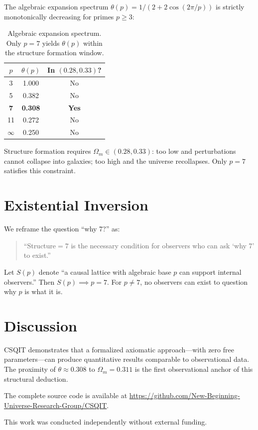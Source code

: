 \documentclass[aps,prl,twocolumn,nofootinbib,floatfix]{revtex4-2}
\begin{document}
The algebraic expansion spectrum $\theta(p) = 1/(2+2\cos(2\pi/p))$ is strictly monotonically decreasing for primes $p \ge 3$:

\begin{table}[h]
\centering
\begin{tabular}{ccc}
\hline
$p$ & $\theta(p)$ & In $(0.28,0.33)$? \\
\hline
3 & 1.000 & No \\
5 & 0.382 & No \\
\textbf{7} & \textbf{0.308} & \textbf{Yes} \\
11 & 0.272 & No \\
$\infty$ & 0.250 & No \\
\hline
\end{tabular}
\caption{Algebraic expansion spectrum. Only $p=7$ yields $\theta(p)$ within the structure formation window.}
\label{tab:spectrum}
\end{table}

Structure formation requires $\Omega_m \in (0.28,0.33)$: too low and perturbations cannot collapse into galaxies; too high and the universe recollapses. Only $p=7$ satisfies this constraint.

\section{Existential Inversion}

We reframe the question ``why 7?'' as:

\begin{quote}
``Structure$=7$ is the necessary condition for observers who can ask `why 7' to exist.''
\end{quote}

Let $S(p)$ denote ``a causal lattice with algebraic base $p$ can support internal observers.'' Then $S(p) \implies p=7$. For $p \neq 7$, no observers can exist to question why $p$ is what it is.

\section{Discussion}

CSQIT demonstrates that a formalized axiomatic approach---with zero free parameters---can produce quantitative results comparable to observational data. The proximity of $\theta \approx 0.308$ to $\Omega_m = 0.311$ is the first observational anchor of this structural deduction.

The complete source code is available at \url{https://github.com/New-Beginning-Universe-Research-Group/CSQIT}.

\acknowledgments

This work was conducted independently without external funding.


\end{document}
